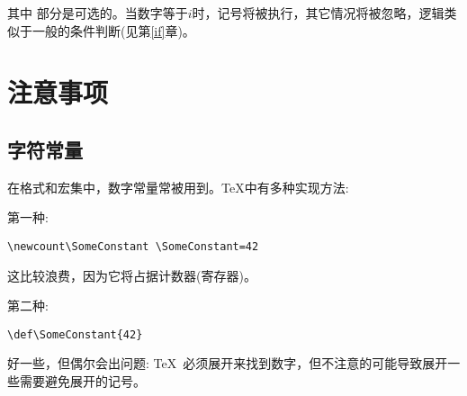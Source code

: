 \documentclass{book}
\begin{document}
其中  部分是可选的。当数字等于$i$时，记号将被执行，其它情况将被忽略，逻辑类似于一般的条件判断(见第\ref{if}章)。


\section{注意事项}

\subsection{字符常量}

在格式和宏集中，数字常量常被用到。\TeX 中有多种实现方法:

第一种:
\begin{verbatim}
\newcount\SomeConstant \SomeConstant=42
\end{verbatim}

这比较浪费，因为它将占据计数器(寄存器)。

第二种:
\begin{verbatim}
\def\SomeConstant{42}
\end{verbatim}

好一些，但偶尔会出问题: \TeX\ 必须展开来找到数字，但不注意的可能导致展开一些需要避免展开的记号。

\end{document}
